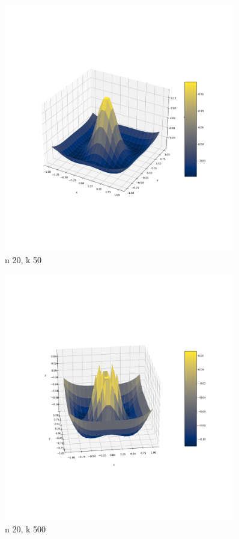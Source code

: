 \documentclass{article}
\begin{document}
    \begin{figure}[h!]
        \centering
        \includegraphics[width=0.9\textwidth]{nal1_n20_k50.png}
        \caption{n 20, k 50}
    \end{figure}

    \begin{figure}[h!]
        \centering
        \includegraphics[width=0.9\textwidth]{nal1_n20_k500.png}
        \caption{n 20, k 500}
    \end{figure}
\end{document}
